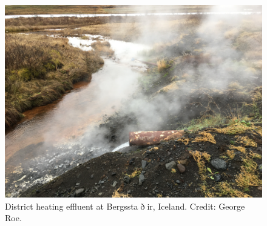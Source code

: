 \begin{figure}[h]
	\centering
	\caption{District heating effluent at Bergssta$\eth$ir, Iceland. Credit: George Roe.}
	\label{fig:bergstadir_effluent}
	
	\includegraphics[width=\textwidth]{figures/BergstadirEffluent.jpg} 


\end{figure}
